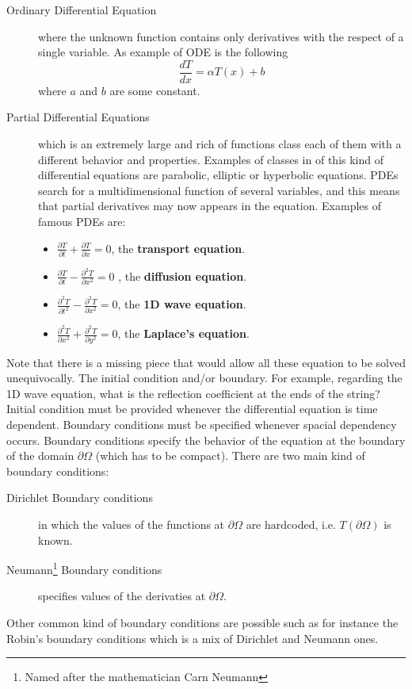 \begin{description}
\item[Ordinary Differential Equation] where the unknown function contains only derivatives with the respect of a single variable. As example of ODE is the following
\[
  \frac{d T}{d x} = \alpha T(x) +b
\] where $a$ and $b$ are some constant.

\item [Partial Differential Equations] which is an extremely large and rich of functions class each of them with a different behavior and properties. Examples of classes in of this kind of differential equations are parabolic, elliptic or hyperbolic equations. PDEs search for a multidimensional function of several variables, and this means that partial derivatives may now appears in the equation. 
Examples of famous PDEs are:
   \begin{itemize}
     \item $\frac{\partial T}{\partial t} + \frac{\partial T}{\partial x} =0$, the \textbf{transport equation}.
     \item $\frac{\partial T}{\partial t} - \frac{\partial^2 T}{\partial x^2}=0$ , the \textbf{diffusion equation}.
     \item $\frac{\partial^2 T}{\partial t^2} -\frac{\partial^2 T}{\partial x^2}=0$, the \textbf{1D wave equation}.
     \item $\frac{\partial^2 T}{\partial x^2} + \frac{\partial^2 T}{\partial y^2}=0$, the \textbf{Laplace's equation}.
   \end{itemize}
\end{description}
Note that there is a missing piece that would allow all these equation to be solved unequivocally. The initial condition and/or boundary. For example, regarding the 1D wave equation, what is the reflection coefficient at the ends of the string? 
Initial condition must be provided whenever the differential equation is time dependent. Boundary conditions must be specified whenever spacial dependency occurs. Boundary conditions specify the behavior of the equation at the boundary of the domain $\partial \Omega$ (which has to be compact). There are two main kind of boundary conditions:
\begin{description}
	\item [Dirichlet Boundary conditions] in which the values of the functions at $\partial \Omega$ are hardcoded, i.e. $T(\partial \Omega)$  is known.
	\item [Neumann\footnote{Named after the mathematician Carn Neumann} Boundary conditions] specifies values of the derivaties at $\partial \Omega$.
	
\end{description} 
Other common kind of boundary conditions are possible such as for instance the Robin's boundary conditions which is a mix of Dirichlet and Neumann ones.

